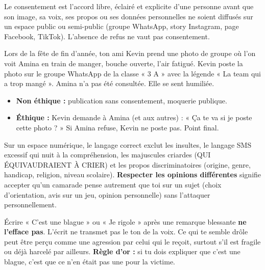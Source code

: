 \documentclass[11pt]{article}
\newcommand{\cle}[1]{{\popxbold\color{popdark}#1}}
\begin{document}
\begin{definition}
Le \cle{consentement} est l'accord libre, éclairé et explicite d'une personne avant que son image, sa voix, ses propos ou ses données personnelles ne soient diffusés sur un espace public ou semi-public (groupe WhatsApp, story Instagram, page Facebook, TikTok). L'absence de refus ne vaut pas consentement.
\end{definition}

\begin{exemplebox}
Lors de la fête de fin d'année, ton ami Kevin prend une photo de groupe où l'on voit Amina en train de manger, bouche ouverte, l'air fatigué. Kevin poste la photo sur le groupe WhatsApp de la classe « 3 A » avec la légende « La team qui a trop mangé ». Amina n'a pas été consultée. Elle se sent humiliée.
\begin{itemize}
    \item \textbf{Non éthique :} publication sans consentement, moquerie publique.
    \item \textbf{Éthique :} Kevin demande à Amina (et aux autres) : « Ça te va si je poste cette photo ? » Si Amina refuse, Kevin ne poste pas. Point final.
\end{itemize}
\end{exemplebox}

\begin{propriete}
Sur un espace numérique, le \cle{langage correct} exclut les insultes, le langage SMS excessif qui nuit à la compréhension, les majuscules criardes (QUI ÉQUIVAUDRAIENT À CRIER) et les propos discriminatoires (origine, genre, handicap, religion, niveau scolaire). \textbf{Respecter les opinions différentes} signifie accepter qu'un camarade pense autrement que toi sur un sujet (choix d'orientation, avis sur un jeu, opinion personnelle) sans l'attaquer personnellement.
\end{propriete}

\begin{attention}
Écrire « C'est une blague » ou « Je rigole » après une remarque blessante \textbf{ne l'efface pas}. L'écrit ne transmet pas le ton de la voix. Ce qui te semble drôle peut être perçu comme une agression par celui qui le reçoit, surtout s'il est fragile ou déjà harcelé par ailleurs. \textbf{Règle d'or :} si tu dois expliquer que c'est une blague, c'est que ce n'en était pas une pour la victime.
\end{attention}
\end{document}
